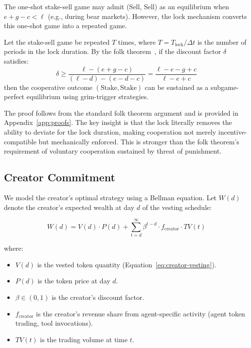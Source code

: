 The one-shot stake-sell game may admit (Sell, Sell) as an equilibrium when
$e + g - c < \ell$ (e.g., during bear markets). However, the \veCORTEX{} lock
mechanism converts this one-shot game into a repeated game.

\begin{theorem}
\label{thm:folk}
Let the stake-sell game be repeated $T$ times, where $T = T_{\text{lock}} /
\Delta t$ is the number of periods in the lock duration. By the folk
theorem~\citep{fudenberg1991game}, if the discount factor $\delta$ satisfies:
\begin{equation}
  \delta \geq \frac{\ell - (e + g - c)}{(\ell - d) - (e - d - c)} = \frac{\ell - e - g + c}{\ell - e + c}
  \label{eq:folk-threshold}
\end{equation}
then the cooperative outcome $(\text{Stake}, \text{Stake})$ can be sustained
as a subgame-perfect equilibrium using grim-trigger strategies.
\end{theorem}

The proof follows from the standard folk theorem argument and is provided in
Appendix~\ref{app:proofs}. The key insight is that the \veCORTEX{} lock
literally removes the ability to deviate for the lock duration, making
cooperation not merely incentive-compatible but mechanically enforced. This is
stronger than the folk theorem's requirement of voluntary cooperation sustained
by threat of punishment.

\subsection{Creator Commitment}
\label{subsec:creator-commitment}

We model the creator's optimal strategy using a Bellman equation. Let $W(d)$
denote the creator's expected wealth at day $d$ of the vesting schedule:

\begin{equation}
  W(d) = V(d) \cdot P(d) + \sum_{t=d}^{\infty} \beta^{t-d} \cdot f_{\text{creator}} \cdot TV(t)
  \label{eq:bellman-creator}
\end{equation}

where:
\begin{itemize}
  \item $V(d)$ is the vested token quantity (Equation~\eqref{eq:creator-vesting}).
  \item $P(d)$ is the token price at day $d$.
  \item $\beta \in (0, 1)$ is the creator's discount factor.
  \item $f_{\text{creator}}$ is the creator's revenue share from agent-specific
    activity (agent token trading, tool invocations).
  \item $TV(t)$ is the trading volume at time $t$.
\end{itemize}

